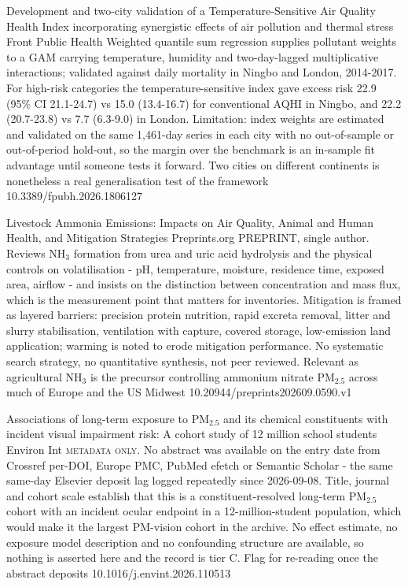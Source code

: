 \documentclass[10pt]{article}
\begin{document}

{Development and two-city validation of a Temperature-Sensitive Air Quality Health Index incorporating synergistic effects of air pollution and thermal stress}
{Front Public Health}
{Weighted quantile sum regression supplies pollutant weights to a GAM carrying temperature, humidity and two-day-lagged multiplicative interactions; validated against daily mortality in Ningbo and London, 2014-2017. For high-risk categories the temperature-sensitive index gave excess risk 22.9 (95\% CI 21.1-24.7) vs 15.0 (13.4-16.7) for conventional AQHI in Ningbo, and 22.2 (20.7-23.8) vs 7.7 (6.3-9.0) in London. Limitation: index weights are estimated and validated on the same 1,461-day series in each city with no out-of-sample or out-of-period hold-out, so the margin over the benchmark is an in-sample fit advantage until someone tests it forward. Two cities on different continents is nonetheless a real generalisation test of the framework}
{10.3389/fpubh.2026.1806127}

{Livestock Ammonia Emissions: Impacts on Air Quality, Animal and Human Health, and Mitigation Strategies}
{Preprints.org}
{PREPRINT, single author. Reviews NH$_3$ formation from urea and uric acid hydrolysis and the physical controls on volatilisation - pH, temperature, moisture, residence time, exposed area, airflow - and insists on the distinction between concentration and mass flux, which is the measurement point that matters for inventories. Mitigation is framed as layered barriers: precision protein nutrition, rapid excreta removal, litter and slurry stabilisation, ventilation with capture, covered storage, low-emission land application; warming is noted to erode mitigation performance. No systematic search strategy, no quantitative synthesis, not peer reviewed. Relevant as agricultural NH$_3$ is the precursor controlling ammonium nitrate PM$_{2.5}$ across much of Europe and the US Midwest}
{10.20944/preprints202609.0590.v1}


{Associations of long-term exposure to PM$_{2.5}$ and its chemical constituents with incident visual impairment risk: A cohort study of 12 million school students}
{Environ Int}
{\textsc{metadata only.} No abstract was available on the entry date from Crossref per-DOI, Europe PMC, PubMed efetch or Semantic Scholar - the same same-day Elsevier deposit lag logged repeatedly since 2026-09-08. Title, journal and cohort scale establish that this is a constituent-resolved long-term PM$_{2.5}$ cohort with an incident ocular endpoint in a 12-million-student population, which would make it the largest PM-vision cohort in the archive. No effect estimate, no exposure model description and no confounding structure are available, so nothing is asserted here and the record is tier C. Flag for re-reading once the abstract deposits}
{10.1016/j.envint.2026.110513}
\end{document}
